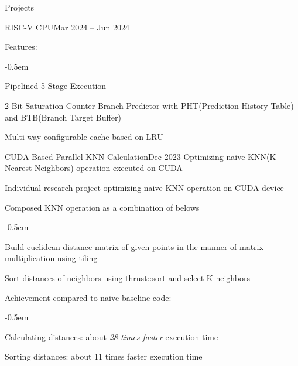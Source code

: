 \documentclass{resume}
\begin{document}
\begin{rSection}{Projects}
\begin{rSubsection}{RISC-V CPU}{Mar 2024 -- Jun 2024}
        \item Features:
        \vspace{-0.5em}
        \begin{list}{--}{\setlength{\rightmargin}{1.5em}}
            \itemsep -0.5em

            \item Pipelined 5-Stage Execution

            \item 2-Bit Saturation Counter Branch Predictor with PHT(Prediction History Table) and BTB(Branch Target Buffer)

            \item Multi-way configurable cache based on LRU
        \end{list}
    \end{rSubsection}

    \begin{rSubsection}{CUDA Based Parallel KNN Calculation}{Dec 2023}
        Optimizing naive KNN(K Nearest Neighbors) operation executed on CUDA

        \item Individual research project optimizing naive KNN operation on CUDA device

        \item Composed KNN operation as a combination of belows
        \vspace{-0.5em}
        \begin{list}{--}{\setlength{\rightmargin}{1.5em}}
            \itemsep -0.5em

            \item Build euclidean distance matrix of given points in the manner of matrix multiplication using tiling

            \item Sort distances of neighbors using thrust::sort and select K neighbors
        \end{list}

        \item Achievement compared to naive baseline code:
        \vspace{-0.5em}
        \begin{list}{--}{\setlength{\rightmargin}{1.5em}}
            \itemsep -0.5em

            \item Calculating distances: about \emph{28 times faster} execution time

            \item Sorting distances: about 11 times faster execution time
        \end{list}
    \end{rSubsection}


\end{rSection}
\end{document}
